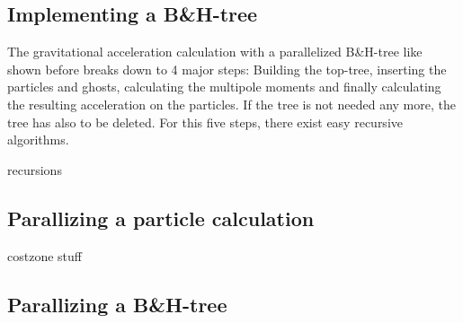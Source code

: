 \subsection{Implementing a B\&H-tree}
The gravitational acceleration calculation with a parallelized B\&H-tree like shown before breaks down to 4 major steps: Building the top-tree, inserting the particles and ghosts, calculating the multipole moments and finally calculating the resulting acceleration on the particles. If the tree is not needed any more, the tree has also to be deleted. For this five steps, there exist easy recursive algorithms.

\begin{algorithm}
\caption{}
\begin{algorithmic}
\label{alg:postorder}
\ENDFOR
\end{algorithmic}
\end{algorithm}


recursions

\subsection{Parallizing a particle calculation}

costzone stuff

\subsection{Parallizing a B\&H-tree}


